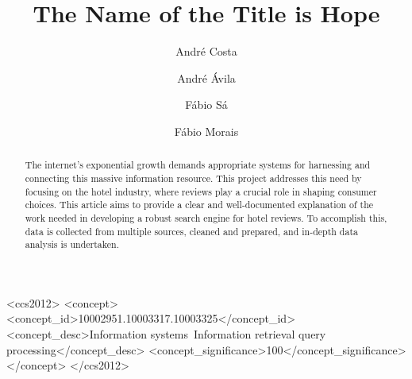 \documentclass[sigconf]{acmart}
\begin{document}
\title{The Name of the Title is Hope}

\author{André Costa}

\author{André Ávila}

\author{Fábio Sá}

\author{Fábio Morais}


\begin{abstract}
  The internet's exponential growth demands appropriate systems for harnessing and connecting this massive information resource. This project addresses this need by focusing on the hotel industry, where reviews play a crucial role in shaping consumer choices. This article aims to provide a clear and well-documented explanation of the work needed in developing a robust search engine for hotel reviews. To accomplish this, data is collected from multiple sources, cleaned and prepared, and in-depth data analysis is undertaken.
\end{abstract}

\begin{CCSXML}
<ccs2012>
<concept>
<concept_id>10002951.10003317.10003325</concept_id>
<concept_desc>Information systems~Information retrieval query processing</concept_desc>
<concept_significance>100</concept_significance>
</concept>
</ccs2012>
\end{CCSXML}
\end{document}
